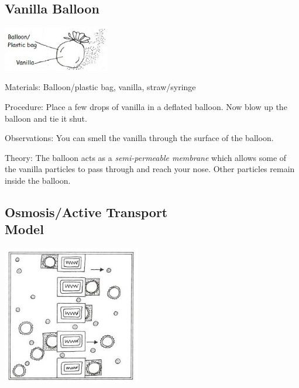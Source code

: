 \begin{multicols}{2}
\columnbreak

\subsection{Vanilla Balloon}

\begin{center}
\includegraphics[width=0.35\textwidth]{./img/vso/osmosis-vanilla.jpg}
\end{center}

\begin{description*}
\item[Materials:]{Balloon/plastic bag, vanilla, straw/syringe}
\item[Procedure:]{Place a few drops of vanilla in a deflated balloon. Now blow up the balloon and tie it shut.}
\item[Observations:]{You can smell the vanilla through the surface of the balloon.}
\item[Theory:]{The balloon acts as a \emph{semi-permeable membrane} which allows some of the vanilla particles to pass through and reach your nose. Other particles remain inside the balloon.}
\end{description*}

\subsection[Osmosis/Active Transport Model]{Osmosis/Active Transport \hfill \\ Model} %

\begin{center}
\includegraphics[width=0.45\textwidth]{./img/vso/active-transport.jpg}
\end{center}


\end{multicols}
